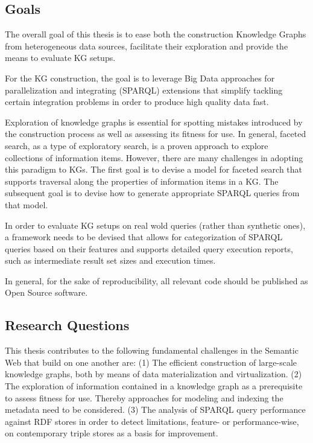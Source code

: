\subsection{Goals}

The overall goal of this thesis is to ease both the construction Knowledge Graphs from heterogeneous data sources, facilitate their exploration and provide the means to evaluate KG setups.

For the KG construction, the goal is to leverage Big Data approaches for parallelization and integrating (SPARQL) extensions that simplify tackling certain integration problems in order to produce high quality data fast.

Exploration of knowledge graphs is essential for spotting mistakes introduced by the construction process as well as assessing its fitness for use. In general, faceted search, as a type of exploratory search, is a proven approach to explore collections of information items. However, there are many challenges in adopting this paradigm to KGs. The first goal is to devise a model for faceted search that supports traversal along the properties of information items in a KG. The subsequent goal is to devise how to generate appropriate SPARQL queries from that model.

In order to evaluate KG setups on real wold queries (rather than synthetic ones), a framework needs to be devised that allows for categorization of SPARQL queries based on their features and supports detailed query execution reports, such as intermediate result set sizes and execution times.

In general, for the sake of reproducibility, all relevant code should be published as Open Source software.

\subsection{Research Questions}

This thesis contributes to the following fundamental challenges in the Semantic Web that build on one another are:
(1) The efficient construction of large-scale knowledge graphs, both by means of data materialization and virtualization.
(2) The exploration of information contained in a knowledge graph as a prerequisite to assess fitness for use.
Thereby approaches for modeling and indexing the metadata need to be considered.
(3) The analysis of SPARQL query performance against RDF stores in order to detect limitations, feature- or performance-wise, on contemporary triple stores as a basis for improvement.

